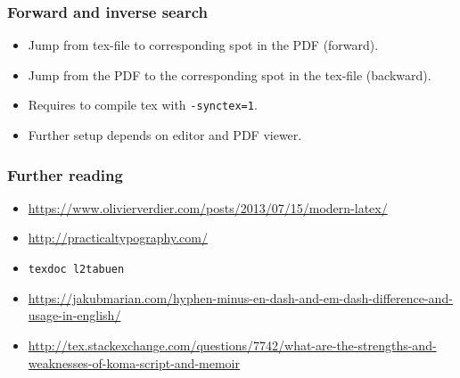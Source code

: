 \documentclass[aspectratio=1610,hyperref={colorlinks,linkcolor=}]{beamer}
\newcommand{\cmd}[1]{\texttt{#1}}
\begin{document}
\begin{frame}
    \frametitle{Forward and inverse search}
    \begin{itemize}
        \item Jump from tex-file to corresponding spot in the PDF (forward).
        \item Jump from the PDF to the corresponding spot in the tex-file (backward).
        \item Requires to compile tex with \cmd{-synctex=1}.
        \item Further setup depends on editor and PDF viewer.
    \end{itemize}
\end{frame}

\begin{frame}
    \frametitle{Further reading}
    \begin{itemize}
        \item \url{https://www.olivierverdier.com/posts/2013/07/15/modern-latex/}
        \item \url{http://practicaltypography.com/}
        \item \cmd{texdoc l2tabuen}
        \item {\small \url{https://jakubmarian.com/hyphen-minus-en-dash-and-em-dash-difference-and-usage-in-english/}}
        \item \url{http://tex.stackexchange.com/questions/7742/what-are-the-strengths-and-weaknesses-of-koma-script-and-memoir}
    \end{itemize}
\end{frame}

\end{document}
